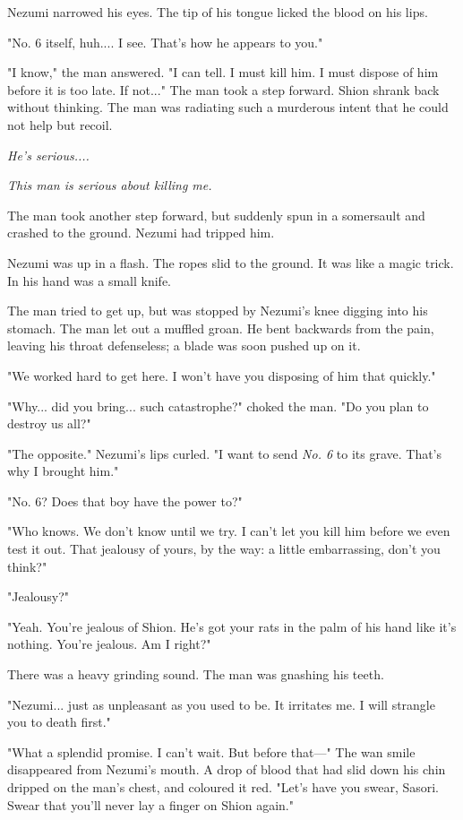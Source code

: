 Nezumi narrowed his eyes. The tip of his tongue licked the blood on his
lips.

"No. 6 itself, huh.... I see. That's how he appears to you."

"I know," the man answered. "I can tell. I must kill him. I must dispose
of him before it is too late. If not..." The man took a step forward.
Shion shrank back without thinking. The man was radiating such a
murderous intent that he could not help but recoil.

\emph{He's serious....}

\emph{This man is serious about killing me.}

The man took another step forward, but suddenly spun in a somersault and
crashed to the ground. Nezumi had tripped him.

Nezumi was up in a flash. The ropes slid to the ground. It was like a
magic trick. In his hand was a small knife.

The man tried to get up, but was stopped by Nezumi's knee digging into
his stomach. The man let out a muffled groan. He bent backwards from the
pain, leaving his throat defenseless; a blade was soon pushed up on it.

"We worked hard to get here. I won't have you disposing of him that
quickly."

"Why... did you bring... such catastrophe?" choked the man. "Do you plan
to destroy us all?"

"The opposite." Nezumi's lips curled. "I want to send \emph{No. 6} to its
grave. That's why I brought him."

"No. 6? Does that boy have the power to?"

"Who knows. We don't know until we try. I can't let you kill him before
we even test it out. That jealousy of yours, by the way: a little
embarrassing, don't you think?"

"Jealousy?"

"Yeah. You're jealous of Shion. He's got your rats in the palm of his
hand like it's nothing. You're jealous. Am I right?"

There was a heavy grinding sound. The man was gnashing his teeth.

"Nezumi... just as unpleasant as you used to be. It irritates me. I will
strangle you to death first."

"What a splendid promise. I can't wait. But before that---" The wan smile
disappeared from Nezumi's mouth. A drop of blood that had slid down his
chin dripped on the man's chest, and coloured it red. "Let's have you
swear, Sasori. Swear that you'll never lay a finger on Shion again."

